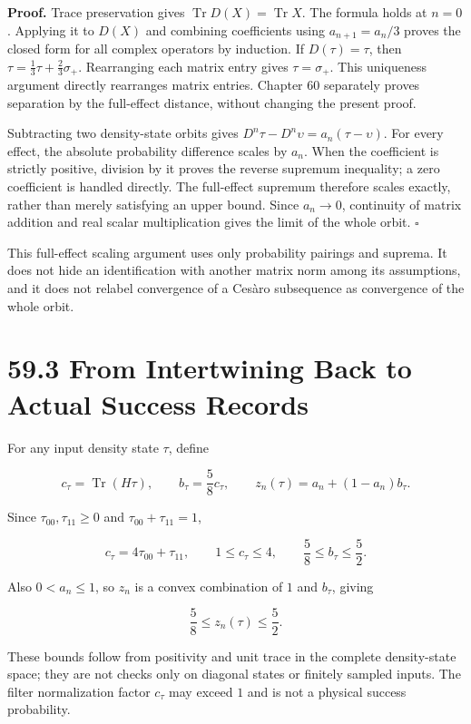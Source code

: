 \documentclass[
  11pt,
  oneside]{book}
\begin{document}
\textbf{Proof.} Trace preservation gives
\(\operatorname{Tr}D(X)=\operatorname{Tr}X\). The formula holds at
\(n=0\). Applying it to \(D(X)\) and combining coefficients using
\(a_{n+1}=a_n/3\) proves the closed form for all complex operators by
induction. If \(D(\tau)=\tau\), then
\(\tau=\frac13\tau+\frac23\sigma_+\). Rearranging each matrix entry
gives \(\tau=\sigma_+\). This uniqueness argument directly rearranges
matrix entries. Chapter 60 separately proves separation by the
full-effect distance, without changing the present proof.

Subtracting two density-state orbits gives
\(D^n\tau-D^n\upsilon=a_n(\tau-\upsilon)\). For every effect, the
absolute probability difference scales by \(a_n\). When the coefficient
is strictly positive, division by it proves the reverse supremum
inequality; a zero coefficient is handled directly. The full-effect
supremum therefore scales exactly, rather than merely satisfying an
upper bound. Since \(a_n\to0\), continuity of matrix addition and real
scalar multiplication gives the limit of the whole orbit. \(\square\)

This full-effect scaling argument uses only probability pairings and
suprema. It does not hide an identification with another matrix norm
among its assumptions, and it does not relabel convergence of a Cesàro
subsequence as convergence of the whole orbit.

\section{59.3 From Intertwining Back to Actual Success Records}

For any input density state \(\tau\), define

\[
c_\tau=\operatorname{Tr}(H\tau),\qquad
b_\tau=\frac58c_\tau,\qquad
z_n(\tau)=a_n+(1-a_n)b_\tau.
\]

Since \(\tau_{00},\tau_{11}\ge0\) and \(\tau_{00}+\tau_{11}=1\),

\[
c_\tau=4\tau_{00}+\tau_{11},\qquad
1\le c_\tau\le4,\qquad
\frac58\le b_\tau\le\frac52.
\]

Also \(0<a_n\le1\), so \(z_n\) is a convex combination of \(1\) and
\(b_\tau\), giving

\[
\frac58\le z_n(\tau)\le\frac52.
\]

These bounds follow from positivity and unit trace in the complete
density-state space; they are not checks only on diagonal states or
finitely sampled inputs. The filter normalization factor \(c_\tau\) may
exceed \(1\) and is not a physical success probability.
\end{document}
